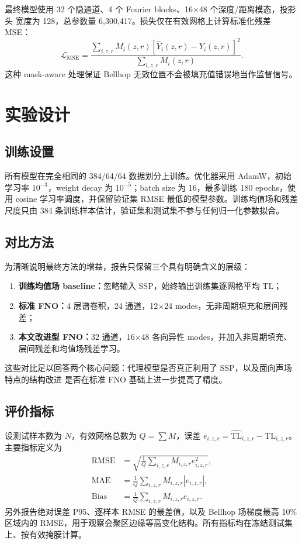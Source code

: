 \documentclass[UTF8,11pt]{ctexart}
\newcommand{\TL}{\mathrm{TL}}
\newcommand{\RMSE}{\mathrm{RMSE}}
\begin{document}
最终模型使用 32 个隐通道、4 个 Fourier blocks、16$\times$48 个深度/距离模态，投影头
宽度为 128，总参数量 6,300,417。损失仅在有效网格上计算标准化残差 MSE：
\begin{equation}
  \mathcal{L}_{\mathrm{MSE}}=
  \frac{\sum_{i,z,r}M_i(z,r)\left[\widehat{Y}_i(z,r)-Y_i(z,r)\right]^2}
  {\sum_{i,z,r}M_i(z,r)}.
\end{equation}
这种 mask-aware 处理保证 Bellhop 无效位置不会被填充值错误地当作监督信号。

\section{实验设计}

\subsection{训练设置}

所有模型在完全相同的 384/64/64 数据划分上训练。优化器采用 AdamW，初始学习率
$10^{-3}$，weight decay 为 $10^{-5}$；batch size 为 16，最多训练 180 epochs，使用
cosine 学习率调度，并保留验证集 RMSE 最低的模型参数。训练均值场和残差尺度只由
384 条训练样本估计，验证集和测试集不参与任何归一化参数拟合。

\subsection{对比方法}

为清晰说明最终方法的增益，报告只保留三个具有明确含义的层级：
\begin{enumerate}
  \item \textbf{训练均值场 baseline：}忽略输入 SSP，始终输出训练集逐网格平均 TL；
  \item \textbf{标准 FNO：}4 层谱卷积，24 通道，12$\times$24 modes，无非周期填充和层间残差；
  \item \textbf{本文改进型 FNO：}32 通道，16$\times$48 各向异性 modes，并加入非周期填充、
  层间残差和均值场残差学习。
\end{enumerate}
这些对比足以回答两个核心问题：代理模型是否真正利用了 SSP，以及面向声场特点的结构改进
是否在标准 FNO 基础上进一步提高了精度。

\subsection{评价指标}

设测试样本数为 $N$，有效网格总数为 $Q=\sum M$，误差
$e_{i,z,r}=\widehat{\TL}_{i,z,r}-\TL_{i,z,r}$。主要指标定义为
\begin{align}
  \RMSE &= \sqrt{\frac{1}{Q}\sum_{i,z,r}M_{i,z,r}e_{i,z,r}^2},\\
  \mathrm{MAE} &= \frac{1}{Q}\sum_{i,z,r}M_{i,z,r}|e_{i,z,r}|,\\
  \mathrm{Bias} &= \frac{1}{Q}\sum_{i,z,r}M_{i,z,r}e_{i,z,r}.
\end{align}
另外报告绝对误差 P95、逐样本 RMSE 的最差值，以及 Bellhop 场梯度最高 10\% 区域内的
RMSE，用于观察会聚区边缘等高变化结构。所有指标均在冻结测试集上、按有效掩膜计算。
\end{document}

